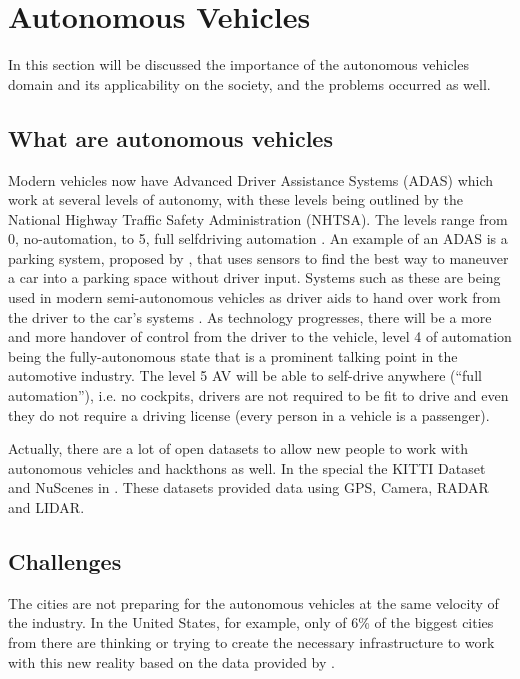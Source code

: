 \section{Autonomous Vehicles} \label{autonomous-vehicles}

In this section will be discussed the importance of the autonomous vehicles domain and its applicability on the society, and the problems occurred as well. 

\subsection{What are autonomous vehicles}
Modern vehicles now have Advanced Driver Assistance Systems (ADAS)
which work at several levels of autonomy, with these levels being
outlined by the National Highway Traffic Safety Administration
(NHTSA). The levels range from 0, no-automation, to 5, full selfdriving automation \cite{national2013preliminary}. An example of an ADAS is a parking system, proposed by \cite{krasner2016automatic}, that uses sensors to find the best way to maneuver a car into a parking space without driver input. Systems such as these are being used in modern semi-autonomous
vehicles as driver aids to hand over work from the driver to the
car’s systems \cite{schoning2006parklenkassistent}. As technology progresses, there will be a more
and more handover of control from the driver to the vehicle, level
4 of automation being the fully-autonomous state that is a prominent talking point in the automotive industry. The level 5 AV will
be able to self-drive anywhere (“full automation”), i.e. no cockpits,
drivers are not required to be fit to drive and even they do not require a driving license (every person in a vehicle is a passenger).

Actually, there are a lot of open datasets to allow new people to work with autonomous vehicles and hackthons as well. In the special the KITTI Dataset \cite{geiger2013vision} and NuScenes in \cite{caesar2020nuscenes}. These datasets provided data using GPS, Camera, RADAR and LIDAR. 

\subsection{Challenges}

The cities are not preparing for the autonomous vehicles at the same velocity of the industry. In the United States, for example, only of 6\% of the biggest cities from there are thinking or trying to create the necessary infrastructure to work with this new reality based on the data provided by \cite{cutler2015many}.

